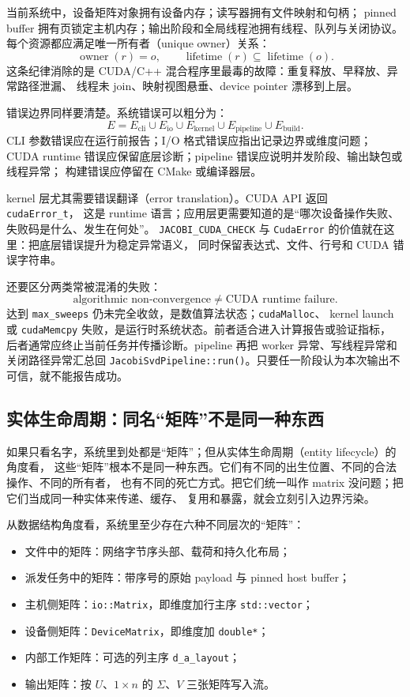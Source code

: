 当前系统中，设备矩阵对象拥有设备内存；读写器拥有文件映射和句柄；
pinned buffer 拥有页锁定主机内存；输出阶段和全局线程池拥有线程、队列与关闭协议。
每个资源都应满足唯一所有者（unique owner）关系：
\[
    \operatorname{owner}(r)=o,
    \qquad
    \operatorname{lifetime}(r)\subseteq\operatorname{lifetime}(o).
\]
这条纪律消除的是 CUDA/C++ 混合程序里最毒的故障：重复释放、早释放、异常路径泄漏、
线程未 join、映射视图悬垂、device pointer 漂移到上层。

错误边界同样要清楚。系统错误可以粗分为：
\[
    E =
    E_{\mathrm{cli}}
    \cup
    E_{\mathrm{io}}
    \cup
    E_{\mathrm{kernel}}
    \cup
    E_{\mathrm{pipeline}}
    \cup
    E_{\mathrm{build}}.
\]
CLI 参数错误应在运行前报告；I/O 格式错误应指出记录边界或维度问题；
CUDA runtime 错误应保留底层诊断；pipeline 错误应说明并发阶段、输出缺包或线程异常；
构建错误应停留在 CMake 或编译器层。

kernel 层尤其需要错误翻译（error translation）。CUDA API 返回 \texttt{cudaError\_t}，
这是 runtime 语言；应用层更需要知道的是“哪次设备操作失败、失败码是什么、发生在何处”。
\texttt{JACOBI\_CUDA\_CHECK} 与 \texttt{CudaError} 的价值就在这里：把底层错误提升为稳定异常语义，
同时保留表达式、文件、行号和 CUDA 错误字符串。

还要区分两类常被混淆的失败：
\[
    \text{algorithmic non-convergence}
    \ne
    \text{CUDA runtime failure}.
\]
达到 \texttt{max\_sweeps} 仍未完全收敛，是数值算法状态；\texttt{cudaMalloc}、
kernel launch 或 \texttt{cudaMemcpy} 失败，是运行时系统状态。前者适合进入计算报告或验证指标，
后者通常应终止当前任务并传播诊断。pipeline 再把 worker 异常、写线程异常和关闭路径异常汇总回
\texttt{JacobiSvdPipeline::run()}。只要任一阶段认为本次输出不可信，就不能报告成功。

\subsection{实体生命周期：同名“矩阵”不是同一种东西}

如果只看名字，系统里到处都是“矩阵”；但从实体生命周期（entity lifecycle）的角度看，
这些“矩阵”根本不是同一种东西。它们有不同的出生位置、不同的合法操作、不同的所有者，
也有不同的死亡方式。把它们统一叫作 matrix 没问题；把它们当成同一种实体来传递、缓存、
复用和暴露，就会立刻引入边界污染。

从数据结构角度看，系统里至少存在六种不同层次的“矩阵”：

\begin{itemize}
    \item 文件中的矩阵：网络字节序头部、载荷和持久化布局；
    \item 派发任务中的矩阵：带序号的原始 payload 与 pinned host buffer；
    \item 主机侧矩阵：\texttt{io::Matrix}，即维度加行主序 \texttt{std::vector}；
    \item 设备侧矩阵：\texttt{DeviceMatrix}，即维度加 \texttt{double*}；
    \item 内部工作矩阵：可选的列主序 \texttt{d\_a\_layout}；
    \item 输出矩阵：按 \(U\)、\(1\times n\) 的 \(\Sigma\)、\(V\) 三张矩阵写入流。
\end{itemize}

